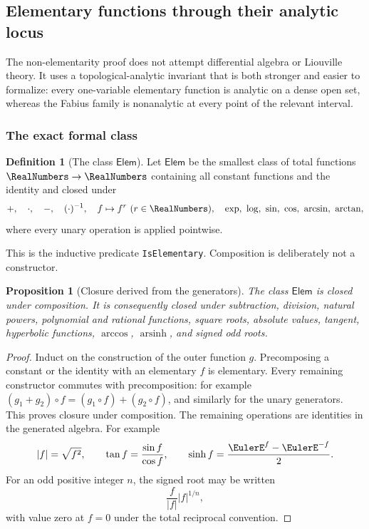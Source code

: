 \documentclass[11pt,oneside]{article}
\newtheorem{proposition}[proposition]{Proposition}
\theoremstyle{definition}
\newtheorem{definition}[definition]{Definition}
\theoremstyle{remark}
\newcommand{\lean}[1]{%
  \ifmmode\text{\texttt{\detokenize{#1}}}\else\nolinkurl{#1}\fi}
\begin{document}
\subsection{Elementary functions through their analytic locus}
\label{integration:sec:elementary}

The non-elementarity proof does not attempt differential algebra or Liouville theory.  It
uses a topological-analytic invariant that is both stronger and easier to formalize: every
one-variable elementary function is analytic on a dense open set, whereas the Fabius family
is nonanalytic at every point of the relevant interval.

\subsubsection{The exact formal class}

\begin{definition}[The class $\mathsf{Elem}$]
\label{integration:def:elementary-class}
Let $\mathsf{Elem}$ be the smallest class of total functions $\RealNumbers\to\RealNumbers$ containing all
constant functions and the identity and closed under
\begin{equation}
 +,\quad\cdot,\quad-,\quad(\cdot)^{-1},\quad
 f\mapsto f^r\ (r\in\RealNumbers),\quad
 \exp,\ \log,\ \sin,\ \cos,\ \arcsin,\ \arctan,
 \label{integration:eq:elementary-generators}
\end{equation}
where every unary operation is applied pointwise.
\end{definition}

This is the inductive predicate \lean{IsElementary}.  Composition is deliberately not a
constructor.

\begin{proposition}[Closure derived from the generators]
\label{integration:prop:elementary-derived}
The class $\mathsf{Elem}$ is closed under composition.  It is consequently closed under
subtraction, division, natural powers, polynomial and rational functions, square roots,
absolute values, tangent, hyperbolic functions, $\arccos$, $\operatorname{arsinh}$, and
signed odd roots.
\end{proposition}

\begin{proof}
Induct on the construction of the outer function $g$.  Precomposing a constant or the
identity with an elementary $f$ is elementary.  Every remaining constructor commutes with
precomposition: for example $(g_1+g_2)\circ f=(g_1\circ f)+(g_2\circ f)$, and similarly for
the unary generators.  This proves closure under composition.  The remaining operations
are identities in the generated algebra.  For example
\[
 |f|=\sqrt{f^2},
 \qquad
 \tan f=\frac{\sin f}{\cos f},
 \qquad
 \sinh f=\frac{\EulerE^f-\EulerE^{-f}}2.
\]
For an odd positive integer $n$, the signed root may be written
\[
 \frac{f}{|f|}|f|^{1/n},
\]
with value zero at $f=0$ under the total reciprocal convention.
\end{proof}
\end{document}
